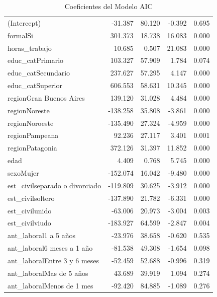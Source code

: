 \documentclass[
  spanish,
  letterpaper,
  DIV=11,
  numbers=noendperiod]{scrartcl}
\begin{document}
\begin{longtable}[t]{lrrrr}
\caption{\label{tab:unnamed-chunk-2}Coeficientes del Modelo AIC}\\
\toprule
\cellcolor{black}{\textcolor{white}{Término}} & \cellcolor{black}{\textcolor{white}{Estimación}} & \cellcolor{black}{\textcolor{white}{Error Est.}} & \cellcolor{black}{\textcolor{white}{Estadístico t}} & \cellcolor{black}{\textcolor{white}{p-valor}}\\
\midrule
(Intercept) & -31.387 & 80.120 & -0.392 & 0.695\\
formalSi & 301.373 & 18.738 & 16.083 & 0.000\\
horas\_trabajo & 10.685 & 0.507 & 21.083 & 0.000\\
educ\_catPrimario & 103.327 & 57.909 & 1.784 & 0.074\\
educ\_catSecundario & 237.627 & 57.295 & 4.147 & 0.000\\
\addlinespace
educ\_catSuperior & 606.553 & 58.631 & 10.345 & 0.000\\
regionGran Buenos Aires & 139.120 & 31.028 & 4.484 & 0.000\\
regionNoreste & -138.258 & 35.808 & -3.861 & 0.000\\
regionNoroeste & -135.490 & 27.324 & -4.959 & 0.000\\
regionPampeana & 92.236 & 27.117 & 3.401 & 0.001\\
\addlinespace
regionPatagonia & 372.126 & 31.397 & 11.852 & 0.000\\
edad & 4.409 & 0.768 & 5.745 & 0.000\\
sexoMujer & -152.074 & 16.042 & -9.480 & 0.000\\
est\_civilseparado o divorciado & -119.809 & 30.625 & -3.912 & 0.000\\
est\_civilsoltero & -137.890 & 21.782 & -6.331 & 0.000\\
\addlinespace
est\_civilunido & -63.006 & 20.973 & -3.004 & 0.003\\
est\_civilviudo & -183.927 & 64.599 & -2.847 & 0.004\\
ant\_laboral1 a 5 años & -23.976 & 38.658 & -0.620 & 0.535\\
ant\_laboral6 meses a 1 año & -81.538 & 49.308 & -1.654 & 0.098\\
ant\_laboralEntre 3 y 6 meses & -52.459 & 52.688 & -0.996 & 0.319\\
\addlinespace
ant\_laboralMas de 5 años & 43.689 & 39.919 & 1.094 & 0.274\\
ant\_laboralMenos de 1 mes & -92.420 & 84.885 & -1.089 & 0.276\\
\bottomrule
\end{longtable}
\end{document}
